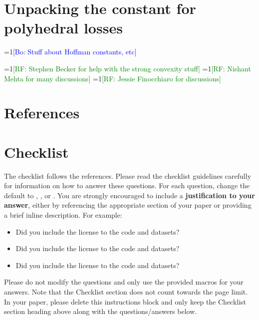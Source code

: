 \documentclass{article}
\theoremstyle{definition}\newtheorem{definition}{Definition}
\theoremstyle{definition}\newtheorem{assumption}{Assumption}
\newcommand{\Comments}{1}
\newcommand{\mynote}[2]{\ifnum\Comments=1\textcolor{#1}{#2}\fi}
\newcommand{\raf}[1]{\mynote{green}{[RF: #1]}}
\newcommand{\bo}[1]{\mynote{blue}{[Bo: #1]}}
\begin{document}
\section{Unpacking the constant for polyhedral losses}

\bo{Stuff about Hoffman constants, etc}




\begin{ack}
  \raf{Stephen Becker for help with the strong convexity stuff}
  \raf{Nishant Mehta for many discussions}
  \raf{Jessie Finocchiaro for discussions}
\end{ack}

\section*{References}




\section*{Checklist}

The checklist follows the references.  Please
read the checklist guidelines carefully for information on how to answer these
questions.  For each question, change the default \answerTODO{} to \answerYes{},
\answerNo{}, or \answerNA{}.  You are strongly encouraged to include a {\bf
justification to your answer}, either by referencing the appropriate section of
your paper or providing a brief inline description.  For example:
\begin{itemize}
  \item Did you include the license to the code and datasets? 
  \item Did you include the license to the code and datasets? 
  \item Did you include the license to the code and datasets? \answerNA{}
\end{itemize}
Please do not modify the questions and only use the provided macros for your
answers.  Note that the Checklist section does not count towards the page
limit.  In your paper, please delete this instructions block and only keep the
Checklist section heading above along with the questions/answers below.
\end{document}
